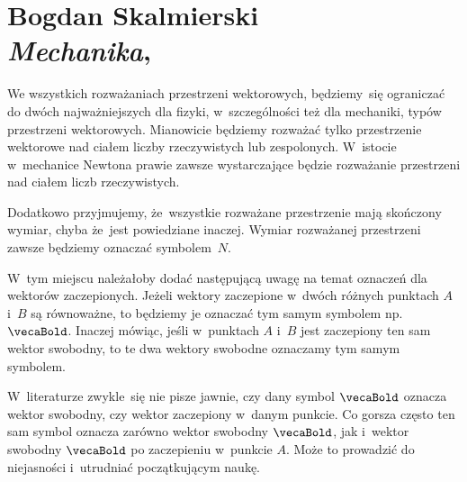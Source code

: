 \documentclass[a4paper,11pt]{article}
\numberwithin{equation}{section}
\begin{document}










\newpage

\section{ %
  Bogdan Skalmierski \\
  \textit{Mechanika}, \cite{SkalmierskiMechanika1998}}

\vspace{0em}



\vspace{0em}


We wszystkich rozważaniach przestrzeni wektorowych, będziemy~się ograniczać
do dwóch najważniejszych dla fizyki, w~szczególności też dla mechaniki,
typów przestrzeni wektorowych. Mianowicie będziemy rozważać tylko
przestrzenie wektorowe nad ciałem liczby rzeczywistych lub zespolonych.
W~istocie w~mechanice Newtona prawie zawsze wystarczające będzie rozważanie
przestrzeni nad ciałem liczb rzeczywistych.

Dodatkowo przyjmujemy, że~wszystkie rozważane przestrzenie mają skończony
wymiar, chyba że~jest powiedziane inaczej. Wymiar rozważanej przestrzeni
zawsze będziemy oznaczać symbolem~$N$.

\VerSpaceFour







\noindent
{} W~tym miejscu należałoby dodać następującą uwagę na temat oznaczeń
dla wektorów zaczepionych. Jeżeli wektory zaczepione w~dwóch różnych
punktach $A$ i~$B$ są równoważne, to będziemy je oznaczać tym samym symbolem
np. $\vecaBold$. Inaczej mówiąc, jeśli w~punktach $A$ i~$B$ jest zaczepiony
ten sam wektor swobodny, to te dwa wektory swobodne oznaczamy tym samym
symbolem.

W~literaturze zwykle~się nie pisze jawnie, czy dany symbol $\vecaBold$
oznacza wektor swobodny, czy wektor zaczepiony w~danym punkcie. Co gorsza
często ten sam symbol oznacza zarówno wektor swobodny $\vecaBold$, jak
i~wektor swobodny $\vecaBold$ po zaczepieniu w~punkcie $A$. Może to
prowadzić do niejasności i~utrudniać początkującym naukę.
\end{document}
